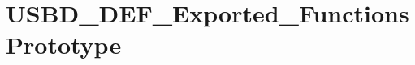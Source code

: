 \hypertarget{group___u_s_b_d___d_e_f___exported___functions_prototype}{\section{U\-S\-B\-D\-\_\-\-D\-E\-F\-\_\-\-Exported\-\_\-\-Functions\-Prototype}
\label{group___u_s_b_d___d_e_f___exported___functions_prototype}
}
